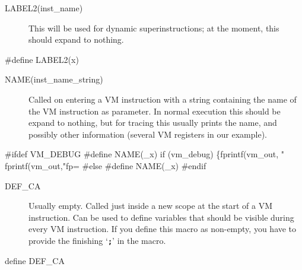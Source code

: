 \documentclass[10pt,english]{article}
\begin{document}
\begin{description}
\item [{LABEL2(inst\_name)}] This will be used for dynamic superinstructions;
at the moment, this should expand to nothing.
\end{description}
\nwenddocs{}\endmoddef
#define LABEL2(x)
\nwendcode{}\nwdocspar

\begin{description}
\item [{NAME(inst\_name\_string)}] Called on entering a VM instruction
with a string containing the name of the VM instruction as parameter.
In normal execution this should be expand to nothing, but for tracing
this usually prints the name, and possibly other information (several
VM registers in our example).
\end{description}
\nwenddocs{}\endmoddef
#ifdef VM_DEBUG
#define NAME(_x) if (vm_debug) \{fprintf(vm_out, "%
                                fprintf(vm_out,"fp=%
#else
#define NAME(_x)
#endif
\nwendcode{}\nwdocspar

\begin{description}
\item [{DEF\_CA}] Usually empty. Called just inside a new scope at the
start of a VM instruction. Can be used to define variables that should
be visible during every VM instruction. If you define this macro as
non-empty, you have to provide the finishing \textquoteleft{}\texttt{\textbf{;}}\textquoteright{}
in the macro.
\end{description}
\nwenddocs{}\endmoddef
define DEF_CA
\nwendcode{}\nwdocspar
\end{document}
